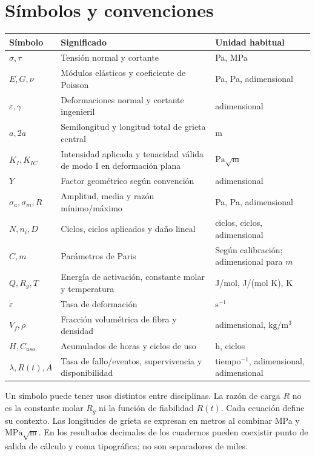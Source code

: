 \chapter*{Símbolos y convenciones}
\begin{longtable}{p{.18\linewidth}p{.51\linewidth}p{.23\linewidth}}\toprule Símbolo & Significado & Unidad habitual\\\midrule\endhead
$\sigma,\tau$ & Tensión normal y cortante & Pa, MPa\\
$E,G,\nu$ & Módulos elásticos y coeficiente de Poisson & Pa, Pa, adimensional\\
$\varepsilon,\gamma$ & Deformaciones normal y cortante ingenieril & adimensional\\
$a,2a$ & Semilongitud y longitud total de grieta central & m\\
$K_I,K_{IC}$ & Intensidad aplicada y tenacidad válida de modo I en deformación plana & $\mathrm{Pa\sqrt m}$\\
$Y$ & Factor geométrico según convención & adimensional\\
$\sigma_a,\sigma_m,R$ & Amplitud, media y razón mínimo/máximo & Pa, Pa, adimensional\\
$N,n_i,D$ & Ciclos, ciclos aplicados y daño lineal & ciclos, ciclos, adimensional\\
$C,m$ & Parámetros de Paris & Según calibración; adimensional para $m$\\
$Q,R_g,T$ & Energía de activación, constante molar y temperatura & J/mol, J/(mol K), K\\
$\dot\varepsilon$ & Tasa de deformación & $\mathrm{s^{-1}}$\\
$V_f,\rho$ & Fracción volumétrica de fibra y densidad & adimensional, $\mathrm{kg/m^3}$\\
$H,C_{uso}$ & Acumulados de horas y ciclos de uso & h, ciclos\\
$\lambda,R(t),A$ & Tasa de fallo/eventos, supervivencia y disponibilidad & tiempo$^{-1}$, adimensional, adimensional\\\bottomrule
\end{longtable}
Un símbolo puede tener usos distintos entre disciplinas. La razón de carga $R$ no es la constante molar $R_g$ ni la función de fiabilidad $R(t)$. Cada ecuación define su contexto. Las longitudes de grieta se expresan en metros al combinar MPa y $\mathrm{MPa\sqrt m}$. En los resultados decimales de los cuadernos pueden coexistir punto de salida de cálculo y coma tipográfica; no son separadores de miles.

\bigskip\creditosportada
